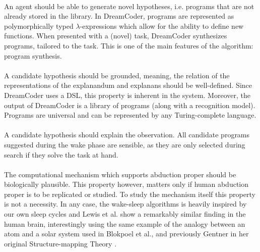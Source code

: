 \paragraph{} An agent should be able to generate novel hypotheses, i.e. programs that are not already stored in the library. In DreamCoder, programs are represented as polymorphically typed $\lambda$-expressions which allow for the ability to define new functions. When presented with a (novel) task, DreamCoder synthesizes programs, tailored to the task. This is one of the main features of the algorithm: program synthesis.


\paragraph{} A candidate hypothesis should be grounded, meaning, the relation of the representations of the explanandum and explanans should be well-defined. Since DreamCoder uses a DSL, this property is inherent in the system. Moreover, the output of DreamCoder is a library of programs (along with a recognition model). Programs are universal and can be represented by any Turing-complete language.

\paragraph{} A candidate hypothesis should explain the observation. All candidate programs suggested during the wake phase are sensible, as they are only selected during search if they solve the task at hand. 

\paragraph{} The computational mechanism which supports abduction proper should be biologically plausible. This property however, matters only if human abduction proper is to be replicated or studied. To study the mechanism itself this property is not a necessity. In any case, the wake-sleep algorithms is heavily inspired by our own sleep cycles and Lewis et al. show a remarkably similar finding in the human brain, interestingly using the same example of the analogy between an atom and a solar system used in Blokpoel et al., and previously Gentner in her original Structure-mapping Theory \cite{lewis2018memory,blokpoel2018deep, gentner1983structure}.

